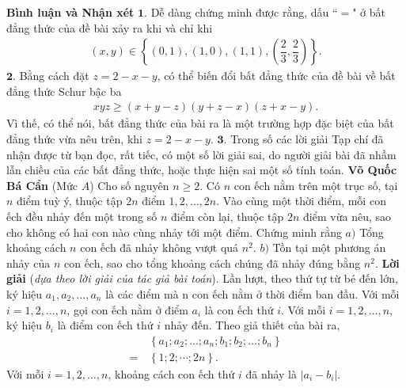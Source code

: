\begin{multicols}{2}
	\vskip 0.05cm
	\textbf{\color{thachthuctoanhoc}Bình luận và Nhận xét}
	\vskip 0.05cm
	$\pmb{1.}$ Dễ dàng chứng minh được rằng, dấu ``$=$" ở bất đẳng thức của đề bài xảy ra khi và chỉ khi
	\begin{align*}
		\left( {x,y} \right) \in \left\{ {\left( {0,1} \right),\left( {1,0} \right),\left( {1,1} \right),\left( {\dfrac{2}{3},\dfrac{2}{3}} \right)} \right\}.
	\end{align*}
	$\pmb{2.}$ Bằng cách đặt $z = 2 - x - y$, có thể biến đổi bất đẳng thức của đề bài về bất đẳng thức Schur bậc ba
	\begin{align*}
		xyz \ge \left( {x + y - z} \right)\left( {y + z - x} \right)\left( {z + x - y} \right).
	\end{align*}
	Vì thế, có thể nói, bất đẳng thức của bài ra là một trường hợp đặc biệt của bất đẳng thức vừa nêu trên, khi $z = 2 - x - y$.
	\vskip 0.05cm
	$\pmb{3.}$ Trong số các lời giải Tạp chí đã nhận được từ bạn đọc, rất tiếc, có một số lời giải sai, do người giải bài đã nhầm lẫn chiều của các bất đẳng thức, hoặc thực hiện sai một số tính toán.
	\vskip 0.05cm
	\hfill \textbf{\color{thachthuctoanhoc}Võ Quốc Bá Cẩn}
	\vskip 0.05cm
	{}
	(Mức $A$) Cho số nguyên $n\ge2$. Có $n$ con ếch nằm trên một trục số, tại $n$ điểm tuỳ ý, thuộc tập $2n$ điểm $1,2,\ldots,2n$. Vào cùng một thời điểm, mỗi con ếch đều nhảy đến một trong số $n$ điểm còn lại, thuộc tập $2n$ điểm vừa nêu, sao cho không có hai con nào cùng nhảy tới một điểm. Chứng minh rằng
	\vskip 0.05cm
	$a)$ Tổng khoảng cách $n$ con ếch đã nhảy không vượt quá $n^2$. 
	\vskip 0.05cm
	$b)$ Tồn tại một phương án nhảy của $n$ con ếch, sao cho tổng khoảng cách chúng đã nhảy đúng bằng $n^2$. 
	\vskip 0.05cm
	\textbf{\color{thachthuctoanhoc}Lời giải} (\textit{dựa theo lời giải của tác giả bài toán}).
	\vskip 0.05cm
	Lần lượt, theo thứ tự từ bé đến lớn, ký hiệu ${a_1},{a_2}, \ldots ,{a_n}$  là các điểm mà n con ếch nằm ở thời điểm ban đầu.
	\vskip 0.05cm
	Với mỗi $i = 1, 2, \ldots, n$, gọi con ếch nằm ở điểm  $a_i$ là con ếch thứ $i$.
	\vskip 0.05cm
	Với mỗi $i = 1, 2, \ldots, n$, ký hiệu $b_i$  là điểm con ếch thứ $i$ nhảy đến.
	\vskip 0.05cm
	Theo giả thiết của bài ra,
	\begin{align*}
		&\left\{ {{a_1};{a_2}; \ldots ;{a_n};{b_1};{b_2}; \ldots ;{b_n}} \right\} \\
		= \,&\left\{ {1;2; \cdots ;2n} \right\}. \tag{$1$}
	\end{align*}
	Với mỗi $i = 1, 2, \ldots, n$, khoảng cách con ếch thứ $i$ đã nhảy là $\left| {{a_i} - {b_i}} \right|.$

\end{multicols}
